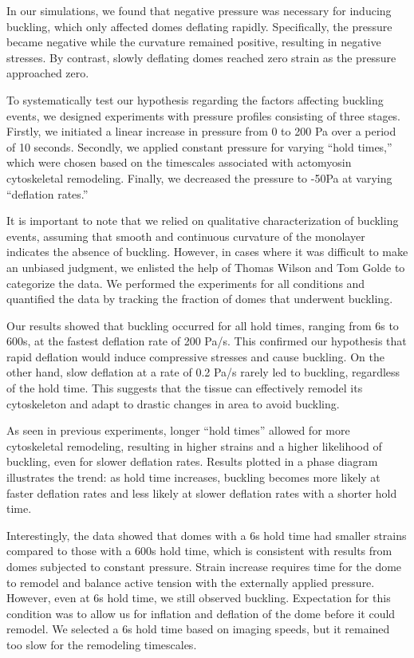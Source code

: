 In our simulations, we found that negative pressure was necessary for
inducing buckling, which only affected domes deflating rapidly.
Specifically, the pressure became negative while the curvature remained
positive, resulting in negative stresses. By contrast, slowly deflating
domes reached zero strain as the pressure approached zero.

To systematically test our hypothesis regarding the factors affecting
buckling events, we designed experiments with pressure profiles
consisting of three stages. Firstly, we initiated a linear increase in
pressure from 0 to 200 Pa over a period of 10 seconds. Secondly, we
applied constant pressure for varying ``hold times,'' which were chosen
based on the timescales associated with actomyosin cytoskeletal
remodeling. Finally, we decreased the pressure to -50Pa at varying
``deflation rates.''

It is important to note that we relied on qualitative characterization
of buckling events, assuming that smooth and continuous curvature of the
monolayer indicates the absence of buckling. However, in cases where it
was difficult to make an unbiased judgment, we enlisted the help of
Thomas Wilson and Tom Golde to categorize the data. We performed the
experiments for all conditions and quantified the data by tracking the
fraction of domes that underwent buckling.

Our results showed that buckling occurred for all hold times, ranging
from 6s to 600s, at the fastest deflation rate of 200 Pa/s. This
confirmed our hypothesis that rapid deflation would induce compressive
stresses and cause buckling. On the other hand, slow deflation at a rate
of 0.2 Pa/s rarely led to buckling, regardless of the hold time. This
suggests that the tissue can effectively remodel its cytoskeleton and
adapt to drastic changes in area to avoid buckling.

As seen in previous experiments, longer ``hold times'' allowed for more
cytoskeletal remodeling, resulting in higher strains and a higher
likelihood of buckling, even for slower deflation rates. Results plotted
in a phase diagram illustrates the trend: as hold time increases,
buckling becomes more likely at faster deflation rates and less likely
at slower deflation rates with a shorter hold time.

Interestingly, the data showed that domes with a 6s hold time had
smaller strains compared to those with a 600s hold time, which is
consistent with results from domes subjected to constant pressure.
Strain increase requires time for the dome to remodel and balance active
tension with the externally applied pressure. However, even at 6s hold
time, we still observed buckling. Expectation for this condition was to
allow us for inflation and deflation of the dome before it could
remodel. We selected a 6s hold time based on imaging speeds, but it
remained too slow for the remodeling timescales.

